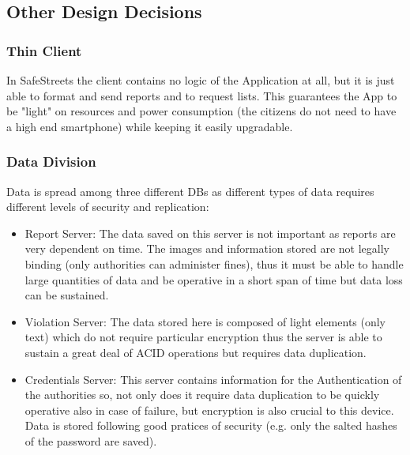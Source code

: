 \subsection{Other Design Decisions}

\subsubsection{Thin Client}

In SafeStreets the client contains no logic of the Application at all, but it is just able to format and send reports and to request lists.
This guarantees the App to be "light" on resources and power consumption (the citizens do not need to have a high end smartphone) while keeping it easily upgradable.

\subsubsection{Data Division}

Data is spread among three different DBs as different types of data requires different levels of security and replication:

\begin{itemize}

    \item  Report Server: The data saved on this server is not important as reports are very dependent on time. The images and information
        stored are not legally binding (only authorities can administer fines), thus it must be able to handle large quantities of data and 
        be operative in a short span of time but data loss can be sustained.

    \item Violation Server: The data stored here is composed of light elements (only text) which do not require particular encryption thus the server 
        is able to sustain a great deal of ACID operations but requires data duplication.

    \item Credentials Server: This server contains information for the Authentication of the authorities so, not only does it require data duplication
        to be quickly operative also in case of failure, but encryption is also crucial to this device. Data is stored following good pratices of 
        security (e.g. only the salted hashes of the password are saved).     

\end{itemize}